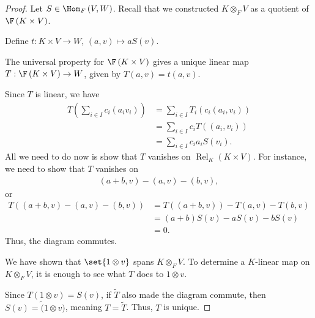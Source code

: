 \documentclass[10pt]{mypackage}
\begin{document}
  \begin{proof}
    Let $S\in \Hom_{F}\left(V,W\right)$. Recall that we constructed $K\otimes_{F}V$ as a quotient of $\F\left(K\times V\right)$.\newline

    Define $t: K\times V \rightarrow W$, $\left(a,v\right) \mapsto aS(v)$.\newline

    The universal property for $\F\left(K\times V\right)$ gives a unique linear map $T: \F\left(K\times V\right) \rightarrow W$, given by $T\left(a,v\right) = t\left(a,v\right)$.\newline

  Since $T$ is linear, we have
  \begin{align*}
    T\left(\sum_{i\in I}c_i\left(a_iv_i\right)\right) &= \sum_{i\in I}T_i\left(c_i\left(a_i,v_i\right)\right)\\
                                                      &= \sum_{i\in I}c_iT\left(\left(a_i,v_i\right)\right)\\
                                                      &= \sum_{i\in I}c_ia_iS\left(v_i\right).
  \end{align*}
  All we need to do now is show that $T$ vanishes on $\operatorname{Rel}_{K}\left(K\times V\right)$. For instance, we need to show that $T$ vanishes on
  \begin{align*}
    \left(a+b,v\right) - \left(a,v\right)-\left(b,v\right),
  \end{align*}
  or
  \begin{align*}
    T\left(\left(a + b,v\right)-\left(a,v\right) - \left(b,v\right)\right) &= T\left(\left(a+b,v\right)\right) - T\left(a,v\right) - T\left(b,v\right)\\
                                                                           &= \left(a+b\right)S(v) - aS(v) - bS(v)\\
                                                                           &= 0.
  \end{align*}
  Thus, the diagram commutes.\newline

  We have shown that $\set{1\otimes v}$ spans $K\otimes_{F}V$. To determine a $K$-linear map on $K\otimes_{F}V$, it is enough to see what $T$ does to $1\otimes v$.\newline

  Since $T\left(1\otimes v\right) = S(v)$, if $\tilde{T}$ also made the diagram commute, then $S(v) = \tilde(1\otimes v)$, meaning $T = \tilde{T}$. Thus, $T$ is unique.
  \end{proof}
\end{document}
